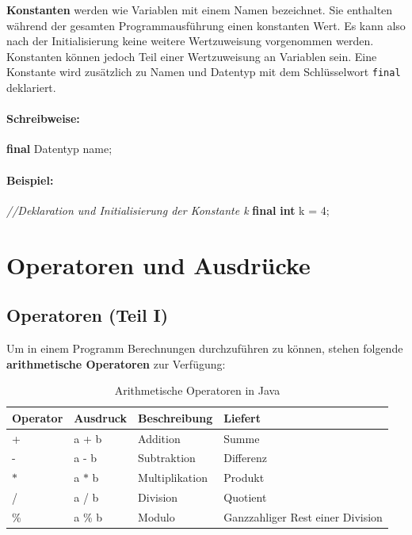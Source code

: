 \documentclass[10pt,paper=17cm:22cm, twoside=true, DIV=14]{scrbook}
\newenvironment {Shaded}
        {\begin{mdframed}[style=code] }
         {\end{mdframed}}
\newcommand{\DataTypeTok}[1]{\textcolor[rgb]{0.1,0.1,0.1}{\textbf{#1}}}
\newcommand{\DecValTok}[1]{\textcolor[rgb]{0.4,0.4,0.4}{{#1}}}
\newcommand{\CommentTok}[1]{\textcolor[RGB]{128,128,128}{\textit{#1}}}
\newcommand{\NormalTok}[1]{#1}
\begin{document}
\textbf{Konstanten} werden wie Variablen mit einem Namen bezeichnet. Sie
enthalten während der gesamten Programmausführung einen konstanten Wert.
Es kann also nach der Initialisierung keine weitere Wertzuweisung
vorgenommen werden. Konstanten können jedoch Teil einer Wertzuweisung an
Variablen sein. Eine Konstante wird zusätzlich zu Namen und Datentyp mit
dem Schlüsselwort \texttt{final} deklariert.

\paragraph{Schreibweise:}\label{schreibweise-2}

\begin{Shaded}
\begin{Highlighting}[]
\DataTypeTok{final} \NormalTok{Datentyp name;}
\end{Highlighting}
\end{Shaded}

\paragraph{Beispiel:}\label{beispiel-4}

\begin{Shaded}
\begin{Highlighting}[]
\CommentTok{//Deklaration und Initialisierung der Konstante k}
\DataTypeTok{final} \DataTypeTok{int} \NormalTok{k = }\DecValTok{4}\NormalTok{;}
\end{Highlighting}
\end{Shaded}

\section{Operatoren und Ausdrücke}\label{operatoren-und-ausdrucke}

\subsection{Operatoren (Teil I)}\label{operatoren-teil-i}

Um in einem Programm Berechnungen durchzuführen zu können, stehen
folgende \textbf{arithmetische Operatoren} zur Verfügung:

\begin{table}[!htpb]\centering
\begin{tabular}{@{}llll@{}}

\toprule
 Operator & Ausdruck & Beschreibung & Liefert \\
\midrule
 + & a + b & Addition & Summe \\
 - & a - b& Subtraktion & Differenz \\
 $\ast$ & a $\ast$ b& Multiplikation& Produkt \\
 / & a / b& Division& Quotient \\
 \% & a \% b& Modulo& Ganzzahliger Rest einer Division \\
\bottomrule
\end{tabular}
\caption{Arithmetische Operatoren in Java}
\label{tab:Operators1}
\end{table}
\end{document}
